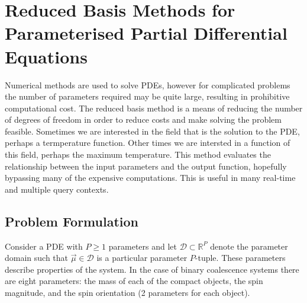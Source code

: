 



 
\chapter{Reduced Basis Methods for Parameterised Partial Differential Equations}
Numerical methods are used to solve PDEs, however for complicated problems the number of parameters required may be quite large, resulting in prohibitive computational cost. The reduced basis method is a means of reducing the number of degrees of freedom in order to reduce costs and make solving the problem feasible. Sometimes we are interested in the field that is the solution to the PDE, perhaps a termperature function. Other times we are intersted in a function of this field, perhaps the maximum temperature. This method evaluates the relationship between the input parameters and the output function, hopefully bypassing many of the expensive computations. This is useful in many real-time and multiple query contexts.

\section{Problem Formulation}
Consider a PDE with $P \geq 1$ parameters and let $\mathcal{D} \subset \mathbb{R}^P$ denote the parameter domain such that $\overrightarrow{\mu}\in \mathcal{D}$ is a particular parameter $P$-tuple. These parameters describe properties of the system. In the case of binary coalescence systems there are eight parameters: the mass of each of the compact objects, the spin magnitude, and the spin orientation (2 parameters for each object). 

